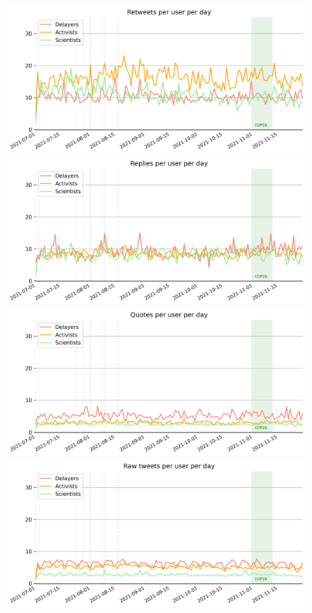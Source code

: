 \documentclass{article}
\begin{document}
\begin{figure}[ht] \label{ fig7} 
  \begin{minipage}[b]{0.4\linewidth}
  \centering
    \includegraphics[width=.8\linewidth]{../figures/retweets_per_day_2022_07_28.jpg} 
    \caption{} 
  \end{minipage} 
  \begin{minipage}[b]{0.4\linewidth}
  \centering
    \includegraphics[width=.8\linewidth]{../figures/replies_per_day_2022_07_28.jpg} 
    \caption{} 
  \end{minipage} 
  \begin{minipage}[b]{0.4\linewidth}
  \centering
    \includegraphics[width=.8\linewidth]{../figures/quotes_per_day_2022_07_28.jpg} 
    \caption{} 
  \end{minipage}
  \hfill
  \hfill
  \begin{minipage}[b]{0.4\linewidth}
  \centering
    \includegraphics[width=.8\linewidth]{../figures/cc_per_day_2022_07_28.jpg} 
    \caption{} 
  \end{minipage} 
\end{figure}
\end{document}
